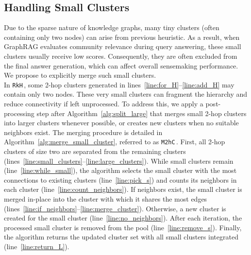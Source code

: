 \documentclass[sigconf]{acmart}
\newcommand{\KHC}{\texttt{RkH}\,}
\newcommand{\MHC}{\texttt{M2hC}\,}
\begin{document}
\subsection{Handling Small Clusters}

Due to the sparse nature of knowledge graphs, many tiny clusters (often containing only two nodes) can arise from previous heuristic.
 As a result, when GraphRAG evaluates community relevance during query answering, these small clusters usually receive low scores. Consequently, they are often excluded from the final answer generation, which can affect overall sensemaking performance.
We propose to explicitly merge such small clusters.\\

 In \KHC, some 2-hop clusters generated in lines~\ref{line:for_H}–\ref{line:add_H} may contain only two nodes. These very small clusters can fragment the hierarchy and reduce connectivity if left unprocessed. To address this, we apply a post-processing step after Algorithm~\ref{alg:split_large} that merges small 2-hop clusters into larger clusters whenever possible, or creates new clusters when no suitable neighbors exist.
The merging procedure is detailed in Algorithm~\ref{alg:merge_small_cluster}, referred to as \MHC.
First, all 2-hop clusters of size two are separated from the remaining clusters (lines~\ref{line:small_clusters}–\ref{line:large_clusters}).
 While small clusters remain (line~\ref{line:while_small}), the algorithm selects the small cluster with the most connections to existing clusters (line~\ref{line:pick_s}) and counts its neighbors in each cluster (line~\ref{line:count_neighbors}). 
If neighbors exist, the small cluster is merged in-place into the cluster with which it shares the most edges (lines~\ref{line:if_neighbors}–\ref{line:merge_cluster}).
Otherwise, a new cluster is created for the small cluster (line~\ref{line:no_neighbors}). After each iteration, the processed small cluster is removed from the pool (line~\ref{line:remove_s}). Finally, the algorithm returns the updated cluster set with all small clusters integrated (line~\ref{line:return_L}).\\
\end{document}
